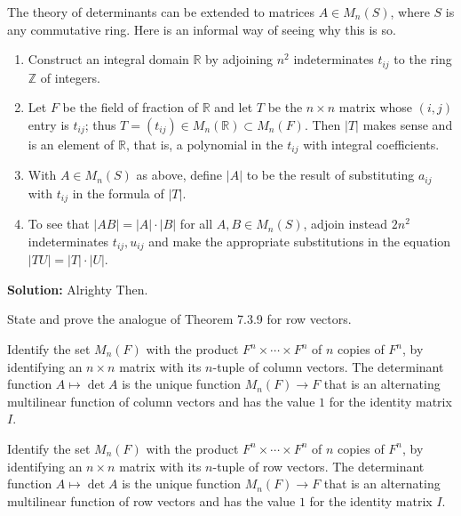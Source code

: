 \begin{tcolorbox}[title=Problem 2, breakable]
    The theory of determinants can be extended to matrices $A \in M_n(S)$,
    where $S$ is any commutative ring. Here is an informal way of seeing why this 
    is so.
    \begin{enumerate}
        \item Construct an integral domain $\mathbb{R}$ by adjoining $n^2$ indeterminates $t_{ij}$
        to the ring $\mathbb{Z}$ of integers.
        \item Let $F$ be the field of fraction of $\mathbb{R}$ and let $T$ be the $n \times n$ matrix 
        whose $(i, j)$ entry is $t_{ij}$; thus $T = (t_{ij}) \in M_n(\mathbb{R}) \subset M_n(F)$.
        Then $|T|$ makes sense and is an element of $\mathbb{R}$, that is, a polynomial in the $t_{ij}$
        with integral coefficients.
        \item With $A \in M_n(S)$ as above, define $|A|$ to be the result of substituting $a_{ij}$ with $t_{ij}$
        in the formula of $|T|$.
        \item To see that $|AB| = |A| \cdot |B|$ for all $A, B \in M_n(S)$, adjoin instead $2n^2$ indeterminates
        $t_{ij}, u_{ij}$ and make the appropriate substitutions in the equation $|TU| = |T| \cdot |U|$.
    \end{enumerate}
\end{tcolorbox}

\textbf{Solution: } Alrighty Then.

\begin{tcolorbox}[title=Problem 3, breakable]
    State and prove the analogue of Theorem 7.3.9 for row vectors.
\end{tcolorbox}

\begin{theorem}[7.3.9]
    Identify the set $M_n(F)$ with the product $F^n \times \cdots \times F^n$ 
    of $n$ copies of $F^n$, by identifying an $n \times n$ matrix with its $n$-tuple of column vectors. 
    The determinant function $A \mapsto \det A$ is the unique function $M_n(F) \to F$ that is 
    an alternating multilinear function of column vectors and has the value $1$ for the identity matrix $I$.
\end{theorem}

\begin{theorem}[7.3.9 Restated]
    Identify the set $M_n(F)$ with the product $F^n \times \cdots \times F^n$ of $n$ copies of $F^n$, 
    by identifying an $n \times n$ matrix with its $n$-tuple of row vectors. 
    The determinant function $A \mapsto \det A$ is the unique function $M_n(F) \to F$ 
    that is an alternating multilinear function of row vectors and has the value $1$ for the identity matrix $I$.
\end{theorem}

